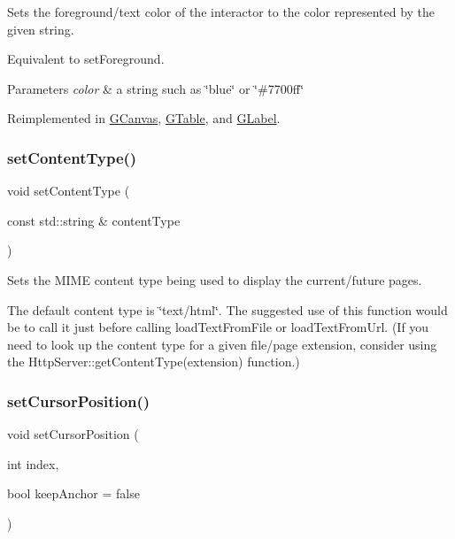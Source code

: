 Sets the foreground/text color of the interactor to the color represented by the given string. 

Equivalent to set\+Foreground. 
\begin{DoxyParams}{Parameters}
{\em color} & a string such as \char`\"{}blue\char`\"{} or \char`\"{}\#7700ff\char`\"{} \\
\hline
\end{DoxyParams}


Reimplemented in \mbox{\hyperlink{classGCanvas_ad148324da1b0340e84e24dffa577ffca}{G\+Canvas}}, \mbox{\hyperlink{classGTable_ad148324da1b0340e84e24dffa577ffca}{G\+Table}}, and \mbox{\hyperlink{classGLabel_ad148324da1b0340e84e24dffa577ffca}{G\+Label}}.

\mbox{\label{classGBrowserPane_a0ba11f3ad4f6257759f0db3dd791e6a4}} 
\subsubsection{\texorpdfstring{set\+Content\+Type()}{setContentType()}}
{\footnotesize\ttfamily void set\+Content\+Type (\begin{DoxyParamCaption}\item[{const std\+::string \&}]{content\+Type }\end{DoxyParamCaption})\hspace{0.3cm}{\ttfamily [virtual]}}



Sets the M\+I\+ME content type being used to display the current/future pages. 

The default content type is \char`\"{}text/html\char`\"{}. The suggested use of this function would be to call it just before calling load\+Text\+From\+File or load\+Text\+From\+Url. (If you need to look up the content type for a given file/page extension, consider using the Http\+Server\+::get\+Content\+Type(extension) function.) \mbox{\label{classGBrowserPane_a5817e10a86be5cd41b3668d8fccb10e0}} 
\subsubsection{\texorpdfstring{set\+Cursor\+Position()}{setCursorPosition()}}
{\footnotesize\ttfamily void set\+Cursor\+Position (\begin{DoxyParamCaption}\item[{int}]{index,  }\item[{bool}]{keep\+Anchor = {\ttfamily false} }\end{DoxyParamCaption})\hspace{0.3cm}{\ttfamily [virtual]}}



